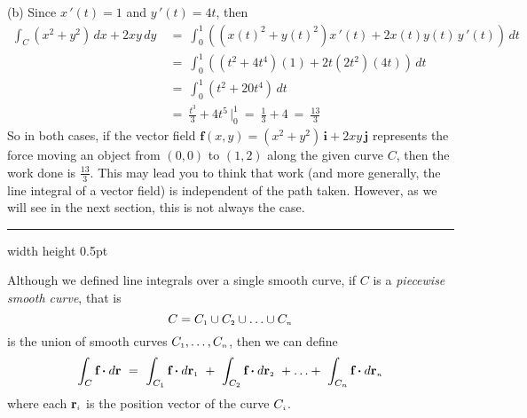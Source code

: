 \begin{exmp}
 \par\noindent (b) Since $x\,'(t)=1$ and $y\,'(t)=4t$, then
 \begin{align*}
  \int_C (x^2 + y^2 )\,dx + 2xy\,dy ~&=~
   \int_0^1 \left( ( x(t)^2 + y(t)^2 )x\,'(t) + 2x(t)y(t)\,y\,'(t) \right) \,dt\\
   &=~ \int_0^1 \left( (t^2 + 4t^4 )(1) + 2t(2t^2 )(4t) \right) \,dt\\
   &=~ \int_0^1 (t^2 + 20t^4 )\,dt\\
   &=~ \frac{t^3}{3} + 4t^5 \,\Bigg|_0^1 ~=~ \frac{1}{3} + 4 ~=~ \frac{13}{3}
 \end{align*}
\newpage
{}
 So in both cases, if the vector field $\textbf{f}(x,y) = ( x^2 + y^2 )\,\textbf{i} +
 2xy\,\textbf{j}$ represents the force moving an object from $(0,0)$ to $(1,2)$ along the given curve $C$, then the
 work done is $\frac{13}{3}$. This may lead you to think that work (and more generally, the line integral of a vector
 field) is independent of the path taken. However, as we will see in the next section, this is not always the
 case.
\end{exmp}
\hrule width \textwidth height 0.5pt
\vspace{3mm}

Although we defined line integrals over a single smooth curve, if $C$ is a \emph{piecewise smooth curve}, that
is
\begin{displaymath}
 C = C_{\scriptscriptstyle 1} \cup C_{\scriptscriptstyle 2} \cup \ldots \cup C_{\scriptscriptstyle n}
\end{displaymath}
is the union of smooth curves $C_{\scriptscriptstyle 1},\ldots ,C_{\scriptscriptstyle n}$, then we can define
\begin{displaymath}
 \int_C \textbf{f} \bm{\cdot} d\textbf{r} ~=~ \int_{C_{\scriptscriptstyle 1}} \textbf{f} \bm{\cdot} d\textbf{r}_{\scriptscriptstyle 1} ~+~
  \int_{C_{\scriptscriptstyle 2}} \textbf{f} \bm{\cdot} d\textbf{r}_{\scriptscriptstyle 2} ~+ \ldots +~
  \int_{C_{\scriptscriptstyle n}} \textbf{f} \bm{\cdot} d\textbf{r}_{\scriptscriptstyle n}
\end{displaymath}
where each $\textbf{r}_{\scriptscriptstyle i}$ is the position vector of the curve $C_{\scriptscriptstyle i}$.

